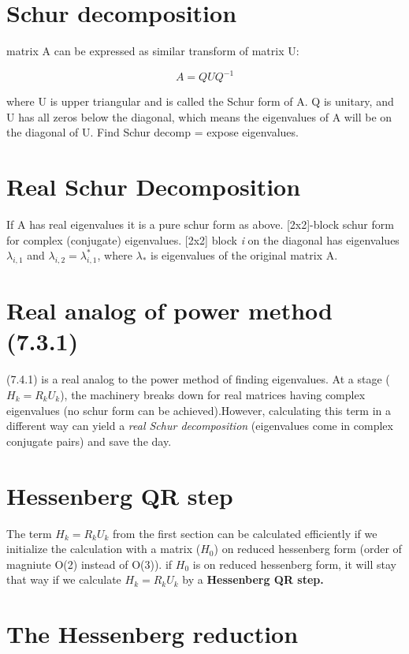 \documentclass[a4paper,10pt]{article}
\title{}
\author{}
\begin{document}
\section*{Schur decomposition}
matrix A can be expressed as similar transform of matrix U:

$$A = QUQ^{-1}$$

where U is upper triangular and is called the Schur form of A.
Q is unitary, and U has all zeros below the diagonal, which means the eigenvalues of A will be on the diagonal of U. Find Schur decomp = expose eigenvalues. 

\section*{Real Schur Decomposition}

If A has real eigenvalues it is a pure schur form as above. [2x2]-block schur form for complex (conjugate) eigenvalues. [2x2] block \textit{i} on the diagonal has eigenvalues $\lambda_{i,1}$ and $\lambda_{i,2} = \lambda_{i,1}^\ast$, where $\lambda_*$ is eigenvalues of the original matrix A. 

\section*{Real analog of power method (7.3.1)}

(7.4.1) is a real analog to the power method of finding eigenvalues. At a stage ($H_k=R_kU_k$), the machinery breaks down for real matrices having complex eigenvalues (no schur form can be achieved).However, calculating this term in a different way can yield a \textit{real Schur decomposition} (eigenvalues come in complex conjugate pairs) and save the day.

\section*{Hessenberg QR step}

The term $H_k=R_kU_k$ from the first section can be calculated efficiently if we initialize the calculation with a matrix ($H_0$) on reduced hessenberg form (order of magniute O(2) instead of O(3)). if $H_0$ is on reduced hessenberg form, it will stay that way if we calculate $H_k=R_kU_k$ by a \textbf{Hessenberg QR step.}

\section*{The Hessenberg reduction}
\end{document}
